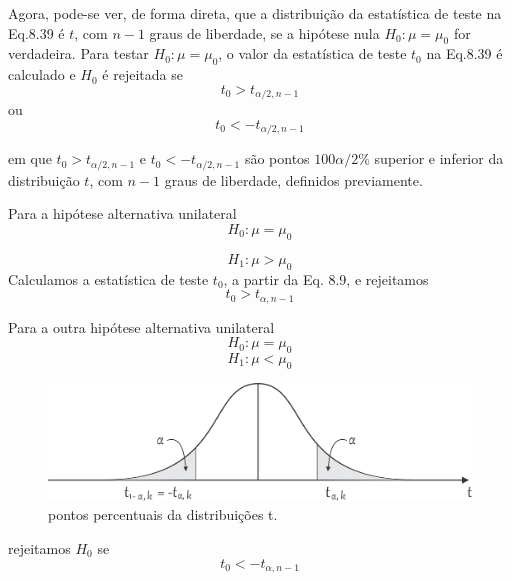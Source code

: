 \documentclass[a4paper,12pt]{article} %
\begin{document}
	Agora, pode-se ver, de forma direta, que a distribuição da estatística de teste na Eq.8.39 é $t$, com $n-1$ graus de liberdade, se a hipótese nula $H_0: \mu = \mu_0$ for verdadeira. Para testar $H_0: \mu = \mu_0$, o valor da estatística de teste $t_0$ na Eq.8.39 é calculado e $H_0$ é rejeitada se
	\begin{equation}
		\tag{8.41a}
		t_0 > t_{\alpha / 2, n-1}
	\end{equation}
	ou
	\begin{equation}
		\tag{8.41b}
		t_0 < - t_{\alpha / 2, n-1}
	\end{equation}

	em que $t_0 > t_{\alpha / 2, n-1}$ e $t_0 < - t_{\alpha / 2, n-1}$ são pontos $100 \alpha / 2 \%$ superior e inferior da distribuição $t$, com $n-1$ graus de liberdade, definidos previamente.
	
	\hspace*{12pt} Para a hipótese alternativa unilateral
	\begin{equation*}
		H_0: \mu = \mu_0
	\end{equation*}
	
	\begin{equation}
		\tag{8.42}
		H_1: \mu > \mu_0
	\end{equation}
	Calculamos a estatística de teste $t_0$, a partir da Eq. 8.9, e rejeitamos %
	\begin{equation}
		\tag{8.43}
		t_0 >  t_{\alpha, n-1}
	\end{equation}

	Para a outra hipótese alternativa unilateral
	\begin{equation*}
		H_0: \mu = \mu_0
	\end{equation*}
	\begin{equation}
		\tag{8.44}
		H_1: \mu < \mu_0
	\end{equation}

	\begin{figure}[H]
		\centering
		\includegraphics[width=0.7\linewidth]{fig2}
		\caption[]{pontos percentuais da distribuições t.}
	
	\end{figure}

	rejeitamos $H_0$ se
	\begin{equation}
		\tag{8.45}
		t_0 < -t_{\alpha, n-1}
	\end{equation}
	

	
	
	
\end{document}
